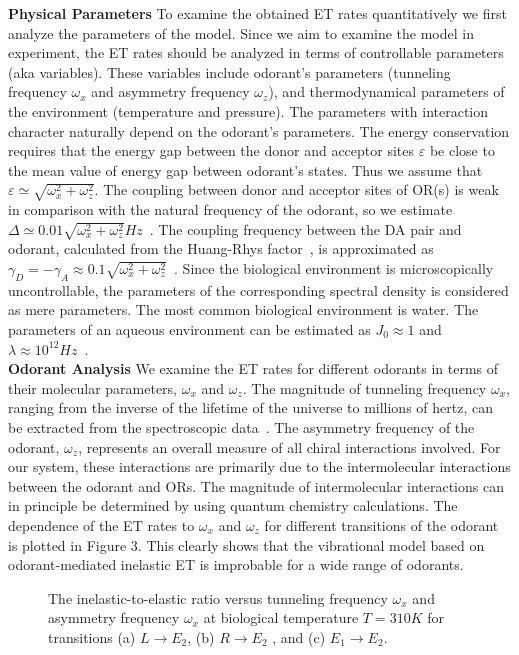 \documentclass[aps,prl,tightenlines,onecolumn,superscriptaddress]{revtex4}
\begin{document}
{\bf Physical Parameters} To examine the obtained ET rates quantitatively we first analyze the parameters of the model. Since we aim to examine the model in experiment, the ET rates should be analyzed in terms of controllable parameters (aka variables). These variables include odorant's parameters (tunneling frequency $\omega_{x}$ and asymmetry frequency $\omega_{z}$), and thermodynamical parameters of the environment (temperature and pressure). The parameters with interaction character naturally depend on the odorant's parameters. The energy conservation requires that the energy gap between the donor and acceptor sites $\varepsilon$ be close to the mean value of energy gap between odorant's states. Thus we assume that $\varepsilon\simeq\sqrt{\omega_{x}^{2}+\omega_{z}^{2}}$. The coupling between donor and acceptor sites of OR(s) is weak in comparison with the natural frequency of the odorant, so we estimate $\Delta\simeq0.01\sqrt{\omega_{x}^{2}+\omega_{z}^{2}}Hz$~\cite{Tir}. The coupling frequency between the DA pair and odorant, calculated from the Huang-Rhys factor~\cite{Bro}, is approximated as $\gamma_{D}=-\gamma_{A}\approx0.1\sqrt{\omega_{x}^{2}+\omega_{z}^{2}} $~\citep{Tir}. Since the biological environment is microscopically uncontrollable, the parameters of the corresponding spectral density is considered as mere parameters. The most common biological environment is water. The parameters of an aqueous environment can be estimated as $J_{0}\approx1$ and $\lambda\approx10^{12}Hz$~\cite{Gil,Tir2}.\\
{\bf Odorant Analysis} We examine the ET rates for different odorants in terms of their molecular parameters, $\omega_{x}$ and $\omega_{z}$. The magnitude of tunneling frequency $\omega_{x}$, ranging from the inverse of the lifetime of the universe to millions of hertz, can be extracted from the spectroscopic data~\cite{QuSt}. The asymmetry frequency of the odorant, $\omega_{z}$, represents an overall measure of all chiral interactions involved. For our system, these interactions are primarily due to the intermolecular interactions between the odorant and ORs. The magnitude of intermolecular interactions can in principle be determined by using quantum chemistry calculations. The dependence of the ET rates to $\omega_{x}$ and $\omega_{z}$ for different transitions of the odorant is plotted in Figure 3. This clearly shows that the vibrational model based on odorant-mediated inelastic ET is improbable for a wide range of odorants.

\begin{figure}[H]
  \centering
  \centering
  \centering
  \caption{The inelastic-to-elastic ratio versus tunneling frequency $\omega_{x}$ and asymmetry frequency $\omega_{x}$ at biological temperature $T=310K$ for transitions (a) $L\rightarrow E_{2}$, (b) $R\rightarrow E_{2}$ , and (c) $E_{1}\rightarrow E_{2}$.}
\end{figure}
\end{document}
